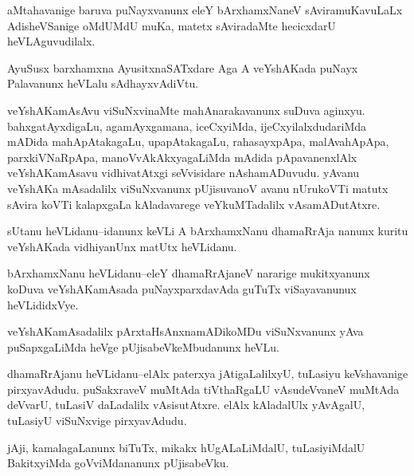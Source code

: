 \documentclass{article}
\begin{document}
\begin{mn}%
aMtahavanige baruva puNayxvanunx eleY bArxhamxNaneV sAviramuKavuLaLx AdisheVSanige oMdUMdU 
muKa, matetx sAviradaMte hecicxdarU heVLAguvudilalx.
\end{mn}

\begin{mn}%
AyuSusx barxhamxna AyusitxnaSATxdare Aga A veYshAKada puNayx Palavanunx heVLalu 
sAdhayxvAdiVtu.
\end{mn}

\begin{mn}%
veYshAKamAsAvu viSuNxvinaMte mahAnarakavanunx suDuva aginxyu. bahxgatAyxdigaLu, 
agamAyxgamana, iceCxyiMda, ijeCxyilalxdudariMda mADida mahApAtakagaLu, upapAtakagaLu, 
rahasayxpApa, malAvahApApa, parxkiVNaRpApa, manoVvAkAkxyagaLiMda mAdida pApavanenxlAlx 
veYshAKamAsavu vidhivatAtxgi seVvisidare nAshamADuvudu. yAvanu veYshAKa mAsadalilx 
viSuNxvanunx pUjisuvanoV avanu nUrukoVTi matutx sAvira koVTi kalapxgaLa kAladavarege 
veYkuMTadalilx vAsamADutAtxre.
\end{mn}


\begin{mn}%
sUtanu heVLidanu--idanunx keVLi A bArxhamxNanu dhamaRrAja nanunx kuritu veYshAKada 
vidhiyanUnx matUtx heVLidanu.
\end{mn}

\begin{mn}%
bArxhamxNanu heVLidanu--eleY dhamaRrAjaneV nararige mukitxyanunx koDuva veYshAKamAsada 
puNayxparxdavAda guTuTx viSayavanunux heVLididxVye.
\end{mn}

\begin{mn}%
veYshAKamAsadalilx pArxtaHsAnxnamADikoMDu viSuNxvanunx yAva puSapxgaLiMda heVge 
pUjisabeVkeMbudanunx heVLu.
\end{mn}

\begin{mn}%
dhamaRrAjanu heVLidanu--elAlx paterxya jAtigaLalilxyU, tuLasiyu keVshavanige pirxyavAdudu. 
puSakxraveV muMtAda tiVthaRgaLU vAsudeVvaneV muMtAda deVvarU, tuLasiV daLadalilx 
vAsisutAtxre. elAlx kAladalUlx yAvAgalU, tuLasiyU viSuNxvige pirxyavAdudu.
\end{mn}

\begin{mn}%
jAji, kamalagaLanunx biTuTx, mikakx hUgALaLiMdalU, tuLasiyiMdalU BakitxyiMda 
goVviMdananunx pUjisabeVku.
\end{mn}
\end{document}
